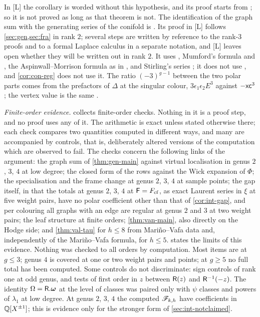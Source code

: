 In \textup{[L]} the corollary is worded without this hypothesis, and its proof starts from ; so it is not proved as long as that theorem is not. The identification of the graph sum with the generating series of the conifold is . Its proof in \textup{[L]} follows \cref{sec:gen,sec:fra} in rank $2$; several steps are written by reference to the rank-$3$ proofs and to a formal Laplace calculus in a separate notation, and \textup{[L]} leaves open whether they will be written out in rank $2$. It uses \cite{Tel12,GP99,CG07,PPZ15}, Mumford's formula and \cite[Theorem~4]{FP00}, the Aspinwall--Morrison formula as in \cite[p.~3]{FP00}, and Stirling's series \cite[5.11.1, 5.12.1]{DLMF}; it does not use \cite[Theorem~31]{CCIT15}, and \cref{cor:con-reg} does not use it. The ratio $(-3)^{g-1}$ between the two polar parts comes from the prefactors of $\Delta$ at the singular colour, $3\epsilon_1\epsilon_2E^3$ against $-\mathsf{x}\mathsf{c}^3$; the vertex value is the same .

\emph{Finite-order evidence.}  collects finite-order checks. Nothing in it is a proof step, and no proof uses any of it. The arithmetic is exact unless stated otherwise there; each check compares two quantities computed in different ways, and many are accompanied by controls, that is, deliberately altered versions of the computation which are observed to fail. The checks concern the following links of the argument: the graph sum of \cref{thm:gen-main} against virtual localisation in genus $2$, $3$, $4$ at low degree; the closed form of the rows against the Wick expansion of $\Phi$; the specialisation and the frame change at genus $2$, $3$, $4$ at sample points; the gap itself, in that the totals at genus $2$, $3$, $4$ at $\mathsf{F}=F_{\mathrm{cf}}$, as exact Laurent series in $\xi$ at five weight pairs, have no polar coefficient other than that of \cref{cor:int-gap}, and per colouring all graphs with an edge are regular at genus $2$ and $3$ at two weight pairs; the leaf structure at finite orders; \cref{thm:van-main}, also directly on the Hodge side; and \cref{thm:val-tau} for $h\leq8$ from Mari\~no--Vafa data and, independently of the Mari\~no--Vafa formula, for $h\leq5$.  states the limits of this evidence. Nothing was checked to all orders by computation. Most items are at $g\leq3$; genus $4$ is covered at one or two weight pairs and points; at $g\geq5$ no full total has been computed. Some controls do not discriminate: sign controls of rank one at odd genus, and tests of first order in $z$ between $\mathsf{R}(z)$ and $\mathsf{R}^{-1}(-z)$. The identity $\Omega=\mathsf{R}.\boldsymbol{\omega}$ at the level of classes was paired only with $\psi$ classes and powers of $\lambda_1$ at low degree. At genus $2$, $3$, $4$ the computed $\mathscr{F}_{k,h}$ have coefficients in $\mathbb{Q}[X^{\pm1}]$; this is evidence only for the stronger form of \cref{sec:int-notclaimed}.

